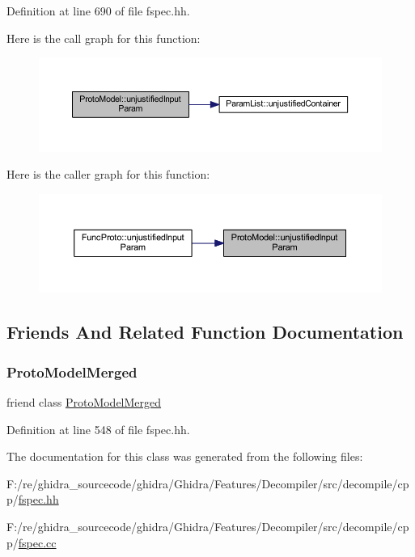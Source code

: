 Definition at line 690 of file fspec.\+hh.

Here is the call graph for this function\+:
\nopagebreak
\begin{figure}[H]
\begin{center}
\leavevmode
\includegraphics[width=350pt]{class_proto_model_a8c0c20931a1fe2c0d3cf4fb3f8fe7c02_cgraph}
\end{center}
\end{figure}
Here is the caller graph for this function\+:
\nopagebreak
\begin{figure}[H]
\begin{center}
\leavevmode
\includegraphics[width=350pt]{class_proto_model_a8c0c20931a1fe2c0d3cf4fb3f8fe7c02_icgraph}
\end{center}
\end{figure}


\subsection{Friends And Related Function Documentation}
\mbox{\label{class_proto_model_a35178d22f44e8a5ab5fcb4d7c9caf25e}} 
\subsubsection{\texorpdfstring{ProtoModelMerged}{ProtoModelMerged}}
{\footnotesize\ttfamily friend class \mbox{\hyperlink{class_proto_model_merged}{Proto\+Model\+Merged}}\hspace{0.3cm}{\ttfamily [friend]}}



Definition at line 548 of file fspec.\+hh.



The documentation for this class was generated from the following files\+:\begin{DoxyCompactItemize}
\item 
F\+:/re/ghidra\+\_\+sourcecode/ghidra/\+Ghidra/\+Features/\+Decompiler/src/decompile/cpp/\mbox{\hyperlink{fspec_8hh}{fspec.\+hh}}\item 
F\+:/re/ghidra\+\_\+sourcecode/ghidra/\+Ghidra/\+Features/\+Decompiler/src/decompile/cpp/\mbox{\hyperlink{fspec_8cc}{fspec.\+cc}}\end{DoxyCompactItemize}

